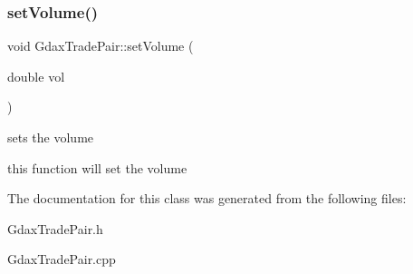\subsubsection{\texorpdfstring{set\+Volume()}{setVolume()}}
{\footnotesize\ttfamily void Gdax\+Trade\+Pair\+::set\+Volume (\begin{DoxyParamCaption}\item[{double}]{vol }\end{DoxyParamCaption})}



sets the volume 

this function will set the volume 

The documentation for this class was generated from the following files\+:\begin{DoxyCompactItemize}
\item 
Gdax\+Trade\+Pair.\+h\item 
Gdax\+Trade\+Pair.\+cpp\end{DoxyCompactItemize}
